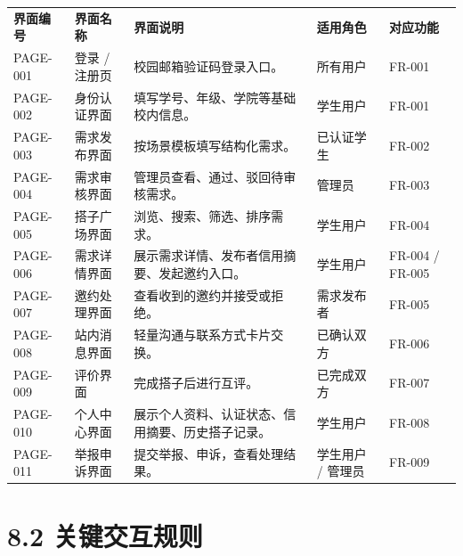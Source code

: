 {\def\LTcaptype{none} %
\begin{xltabular}{\textwidth}{@{}>{\centering\arraybackslash}X>{\centering\arraybackslash}X>{\centering\arraybackslash}X>{\centering\arraybackslash}X>{\centering\arraybackslash}X@{}}
\toprule\noalign{}
\endhead
\bottomrule\noalign{}
\endlastfoot
\textbf{界面编号} & \textbf{界面名称} & \textbf{界面说明} &
\textbf{适用角色} & \textbf{对应功能} \\
PAGE-001 & 登录 / 注册页 & 校园邮箱验证码登录入口。 & 所有用户 &
FR-001 \\
PAGE-002 & 身份认证界面 & 填写学号、年级、学院等基础校内信息。 &
学生用户 & FR-001 \\
PAGE-003 & 需求发布界面 & 按场景模板填写结构化需求。 & 已认证学生 &
FR-002 \\
PAGE-004 & 需求审核界面 & 管理员查看、通过、驳回待审核需求。 & 管理员 &
FR-003 \\
PAGE-005 & 搭子广场界面 & 浏览、搜索、筛选、排序需求。 & 学生用户 &
FR-004 \\
PAGE-006 & 需求详情界面 & 展示需求详情、发布者信用摘要、发起邀约入口。 &
学生用户 & FR-004 / FR-005 \\
PAGE-007 & 邀约处理界面 & 查看收到的邀约并接受或拒绝。 & 需求发布者 &
FR-005 \\
PAGE-008 & 站内消息界面 & 轻量沟通与联系方式卡片交换。 & 已确认双方 &
FR-006 \\
PAGE-009 & 评价界面 & 完成搭子后进行互评。 & 已完成双方 & FR-007 \\
PAGE-010 & 个人中心界面 &
展示个人资料、认证状态、信用摘要、历史搭子记录。 & 学生用户 & FR-008 \\
PAGE-011 & 举报申诉界面 & 提交举报、申诉，查看处理结果。 & 学生用户 /
管理员 & FR-009 \\
\end{xltabular}
}

\section{8.2
关键交互规则}\label{ux5173ux952eux4ea4ux4e92ux89c4ux5219}

